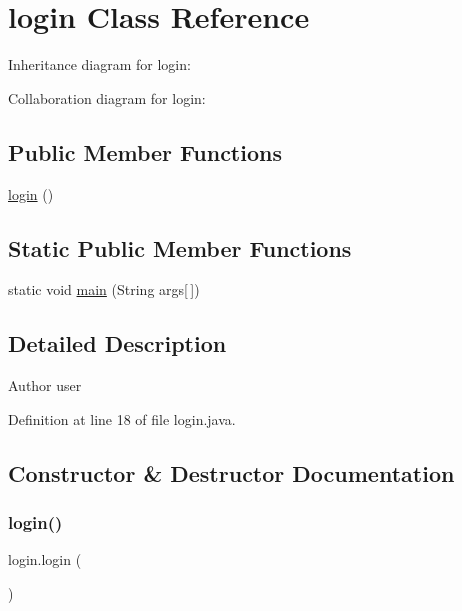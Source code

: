 \hypertarget{classlogin}{}\section{login Class Reference}
\label{classlogin}


Inheritance diagram for login\+:


Collaboration diagram for login\+:
\subsection*{Public Member Functions}
\begin{DoxyCompactItemize}
\item 
\mbox{\hyperlink{classlogin_ab60d2ceb819e17208de8a02246c244ca}{login}} ()
\end{DoxyCompactItemize}
\subsection*{Static Public Member Functions}
\begin{DoxyCompactItemize}
\item 
static void \mbox{\hyperlink{classlogin_aad3485790bebb6435902a963b96cc93a}{main}} (String args\mbox{[}$\,$\mbox{]})
\end{DoxyCompactItemize}


\subsection{Detailed Description}
\begin{DoxyAuthor}{Author}
user 
\end{DoxyAuthor}


Definition at line 18 of file login.\+java.



\subsection{Constructor \& Destructor Documentation}
\mbox{\label{classlogin_ab60d2ceb819e17208de8a02246c244ca}} 
\subsubsection{\texorpdfstring{login()}{login()}}
{\footnotesize\ttfamily login.\+login (\begin{DoxyParamCaption}{ }\end{DoxyParamCaption})}

